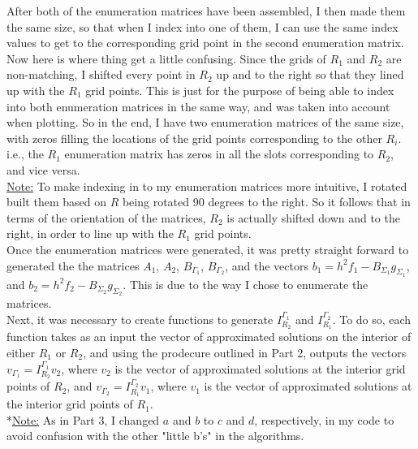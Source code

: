 \documentclass[12pt]{article}
\begin{document}
\noindent
After both of the enumeration matrices have been assembled, I then made them the same size, so that when I index into one of them, I can use the same index values to get to the corresponding grid point in the second enumeration matrix.  Now here is where thing get a little confusing.  Since the grids of {\color{blue}$R_1$} and {\color{red}$R_2$} are non-matching, I shifted every point in {\color{red}$R_2$} up and to the right so that they lined up with the {\color{blue}$R_1$} grid points.  This is just for the purpose of being able to index into both enumeration matrices in the same way, and was taken into account when plotting.  So in the end, I have two enumeration matrices of the same size, with zeros filling the locations of the grid points corresponding to the other $R_i$. i.e., the {\color{blue}$R_1$} enumeration matrix has zeros in all the slots corresponding to {\color{red}$R_2$}, and vice versa.\\

\noindent
\underline{Note:}  To make indexing in to my enumeration matrices more intuitive, I rotated built them based on $R$ being rotated 90 degrees to the right.  So it follows that in terms of the orientation of the matrices, $R_2$ is actually shifted down and to the right, in order to line up with the $R_1$ grid points.\\

\noindent
Once the enumeration matrices were generated, it was pretty straight forward to generated the the matrices $A_1$, $A_2$, $B_{\Gamma_1}$, $B_{\Gamma_2}$, and the vectors $b_1= h^2f_1 - B_{\Sigma_1}g_{\Sigma_1}$, and $b_2= h^2f_2 - B_{\Sigma_2}g_{\Sigma_2}$.  This is due to the way I chose to enumerate the matrices.\\

\noindent
Next, it was necessary to create functions to generate $I_{R_2}^{\Gamma_1}$ and $I_{R_1}^{\Gamma_2}$.  To do so, each function takes as an input the vector of approximated solutions on the interior of either $R_1$ or $R_2$, and using the prodecure outlined in Part 2, outputs the vectors $v_{\Gamma_1} = I_{R_2}^{\Gamma_1}v_2$, where $v_2$ is the vector of approximated solutions at the interior grid points of $R_2$, and $v_{\Gamma_2} = I_{R_1}^{\Gamma_2}v_1$, where $v_1$ is the vector of approximated solutions at the interior grid points of $R_1$.\\

\noindent
*\underline{Note:} As in Part 3, I changed $a$ and $b$ to $c$ and $d$, respectively, in my code to avoid confusion with the other "little b's" in the algorithms.
\end{document}
